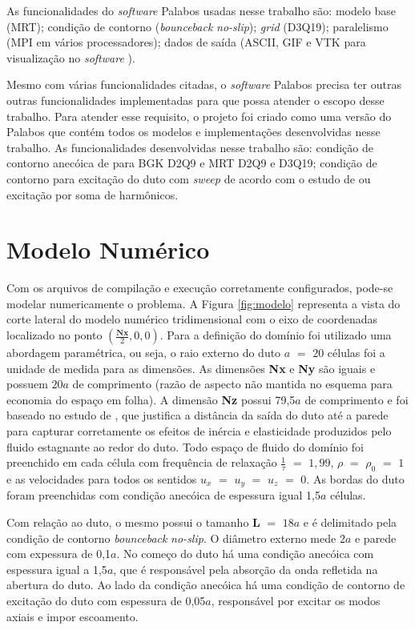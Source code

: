 As funcionalidades do \textit{software} Palabos usadas nesse trabalho são: modelo base (MRT); condição de contorno (\textit{bounceback} \textit{no-slip}); \textit{grid} (D3Q19); paralelismo (MPI em vários processadores); dados de saída (ASCII, GIF e VTK para visualização no \textit{software} ).

Mesmo com várias funcionalidades citadas, o \textit{software} Palabos precisa ter outras outras funcionalidades implementadas para que possa atender o escopo desse trabalho. Para atender esse requisito, o projeto  foi criado como uma versão do Palabos que contém todos os modelos e implementações desenvolvidas nesse trabalho. As funcionalidades desenvolvidas nesse trabalho são: condição de contorno anecóica de  para BGK D2Q9 e MRT D2Q9 e D3Q19; condição de contorno para excitação do duto com \textit{sweep} de acordo com o estudo de  ou excitação por soma de harmônicos.


\section{Modelo Numérico}
\label{sec:modelo_numerico}

Com os arquivos de compilação e execução corretamente configurados, pode-se modelar numericamente o problema. A Figura \ref{fig:modelo} representa a vista do corte lateral do modelo numérico tridimensional com o eixo de coordenadas localizado no ponto $(\frac{\textbf{Nx}}{2}, 0, 0)$. Para a definição do domínio foi utilizado uma abordagem paramétrica, ou seja, o raio externo do duto $a$ $=$ $20$ células foi a unidade de medida para as dimensões. As dimensões \textbf{Nx} e \textbf{Ny} são iguais e possuem $20a$ de comprimento (razão de aspecto não mantida no esquema para economia do espaço em folha). A dimensão \textbf{Nz} possui 79,5$a$ de comprimento e foi baseado no estudo de , que justifica a distância da saída do duto até a parede para capturar corretamente os efeitos de inércia e elasticidade produzidos pelo fluido estagnante ao redor do duto. Todo espaço de fluido do domínio foi preenchido em cada célula com frequência de relaxação $\frac{1}{\tau}$ $=$ $1,99$, $\rho$ $=$ $\rho_{0}$ $=$ $1$ e as velocidades para todos os sentidos $u_{x}$ $=$ $u_{y}$ $=$ $u_{z}$ $=$ $0$. As bordas do duto foram preenchidas com condição anecóica de espessura igual 1,5$a$ células.      

Com relação ao duto, o mesmo possui o tamanho \textbf{L} $=$ $18a$ e é delimitado pela condição de contorno \textit{bounceback} \textit{no-slip}. O diâmetro externo mede $2a$ e parede com expessura de 0,1$a$. No começo do duto há uma condição anecóica com espessura igual a 1,5$a$, que é responsável pela absorção da onda refletida na abertura do duto. Ao lado da condição anecóica há uma condição de contorno de excitação do duto com espessura de 0,05$a$, responsável por excitar os modos axiais e impor escoamento.    

